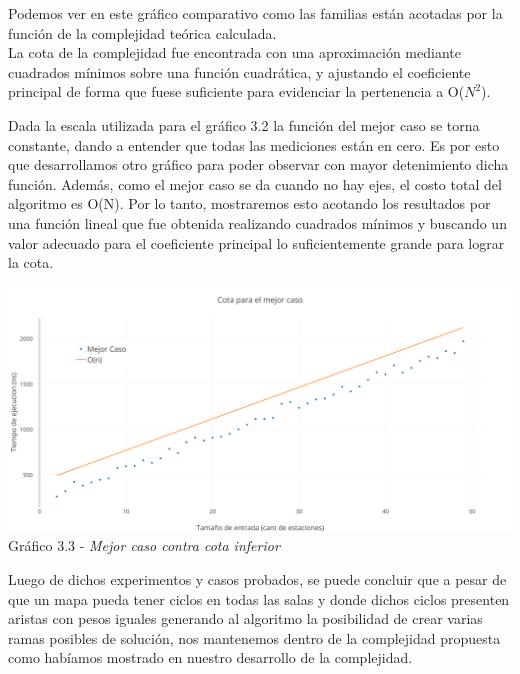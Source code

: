 Podemos ver en este gr\'afico comparativo como las familias est\'an acotadas por la funci\'on de la complejidad te\'orica calculada.\\

La cota de la complejidad fue encontrada con una aproximaci\'on mediante cuadrados m\'inimos sobre una función cuadrática, y ajustando el coeficiente principal de forma que fuese suficiente para evidenciar la pertenencia a O($N^2$).
  
Dada la escala utilizada para el gr\'afico 3.2 la función del mejor caso se torna constante, dando a entender que todas las mediciones están en cero. Es por esto que desarrollamos otro gr\'afico para poder observar con mayor detenimiento dicha funci\'on.
Además, como el mejor caso se da cuando no hay ejes, el costo total del algoritmo es O(N). Por lo tanto, mostraremos esto acotando los resultados por una función lineal que fue obtenida realizando cuadrados m\'inimos y buscando un valor adecuado para el coeficiente principal lo suficientemente grande para lograr la cota.

  \vspace*{0.3cm} \vspace*{0.3cm}
  \begin{center}
\includegraphics[scale=0.5]{./EJ3/Mejorcasoycotainferior.png}
{Gr\'afico 3.3 - \textit{Mejor caso contra cota inferior}}
  \end{center}
  \vspace*{0.3cm}

Luego de dichos experimentos y casos probados, se puede concluir que a pesar de que un mapa pueda tener ciclos en todas las salas y donde dichos ciclos presenten aristas con pesos iguales generando al algoritmo la posibilidad de crear varias ramas posibles de soluci\'on, nos mantenemos dentro de la complejidad propuesta como hab\'iamos mostrado en nuestro desarrollo de la complejidad.\\
